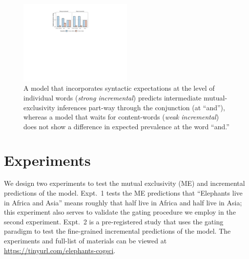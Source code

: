 \documentclass[10pt,letterpaper]{article}
\providecommand{\tightlist}{%
  \setlength{\itemsep}{0pt}\setlength{\parskip}{0pt}}
\newcommand{\denote}[1]{\mbox{ $[\![ #1 ]\!]$}}
\begin{document}
\begin{figure}[t]
  \centering
    \includegraphics[width=0.5\textwidth]{incremental}
    \vspace{-0.8cm}
  \caption{A model that incorporates syntactic expectations at the level of individual words (\emph{strong incremental}) predicts intermediate mutual-exclusivity inferences part-way through the conjunction (at ``and''), whereas a model that waits for content-words (\emph{weak incremental}) does not show a difference in expected prevalence at the word ``and.''
  }
          \vspace{-0.5cm}
  \label{fig:incremental}
\end{figure}


%


\section{Experiments}

We design two experiments to test the mutual exclusivity (ME) and incremental predictions of the model. 
Expt.~1 tests the ME predictions that ``Elephants live in Africa and Asia'' means roughly that half live in Africa and half live in Asia; this experiment also serves to validate the gating procedure we employ in the second experiment. 
Expt.~2 is a pre-registered study that uses the gating paradigm to test the fine-grained incremental predictions of the model.
The experiments and full-list of materials can be viewed at \url{https://tinyurl.com/elephants-cogsci}.
\end{document}
